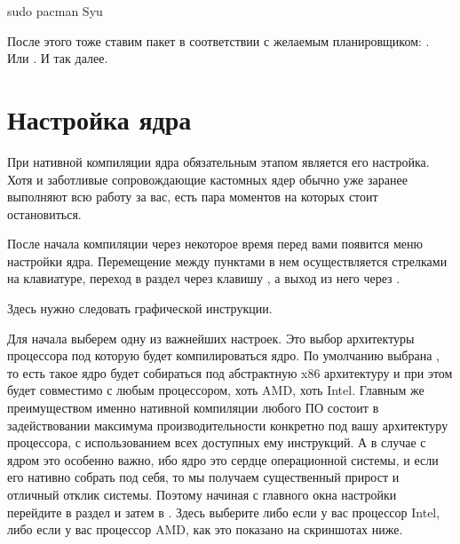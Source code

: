 \documentclass[letterpaper,10pt,russian,openany]{sphinxmanual}
\begin{document}
\begin{sphinxVerbatim}[commandchars=\\\{\}]
sudo pacman \PYGZhy{}Syu
\end{sphinxVerbatim}

\sphinxAtStartPar
После этого тоже ставим пакет в соответствии с желаемым планировщиком: .
Или . И так далее.

\ignorespaces 

\section{Настройка ядра}
\label{\detokenize{source/custom-kernels:manual-kernel-configuration}}\label{\detokenize{source/custom-kernels:index-6}}\label{\detokenize{source/custom-kernels:id8}}
\sphinxAtStartPar
При нативной компиляции ядра обязательным этапом является его настройка.
Хотя и заботливые сопровождающие кастомных ядер обычно уже заранее выполняют
всю работу за вас, есть пара моментов на которых стоит остановиться.

\sphinxAtStartPar
После начала компиляции через некоторое время перед вами появится меню настройки ядра.
Перемещение между пунктами в нем осуществляется стрелками на клавиатуре, переход в
раздел через клавишу , а выход из него через .

\sphinxAtStartPar
Здесь нужно следовать графической инструкции.

\sphinxAtStartPar
{} Для начала выберем одну из важнейших настроек. Это выбор архитектуры процессора под которую будет компилироваться ядро.
По умолчанию выбрана , то есть такое ядро будет собираться под абстрактную x86 архитектуру и при этом будет совместимо
с любым процессором, хоть AMD, хоть Intel. Главным же преимуществом именно нативной компиляции любого ПО состоит в задействовании
максимума производительности конкретно под вашу архитектуру процессора, с использованием всех доступных ему инструкций. А в случае
с ядром это особенно важно, ибо ядро это сердце операционной системы, и если его нативно собрать под себя, то мы получаем существенный
прирост и отличный отклик системы. Поэтому начиная с главного окна настройки перейдите в раздел  и затем
в . Здесь выберите либо  если у вас процессор Intel, либо  если
у вас процессор AMD, как это показано на скриншотах ниже.
\end{document}
